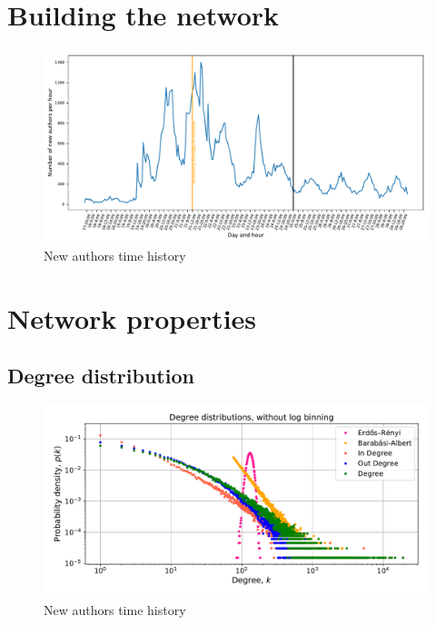 \documentclass[12pt, twoside]{report}
\begin{document}
    \chapter{Building the network}

    \begin{figure}[htbp]
      \centering
\includegraphics[width=\textwidth]{../../scripts/visualization/imgs/time_history.pdf}            
      \caption{New authors time history}
      \label{fig:time_history}
    \end{figure}

    
    \chapter{Network properties}

 \section{Degree distribution}    
    \begin{figure}[htbp]
      \centering
      \includegraphics[width=\textwidth]{../../scripts/visualization/imgs/degree_distributions_nobinlog.pdf}            
      \caption{New authors time history}
      \label{fig:degree}
    \end{figure}
\end{document}
